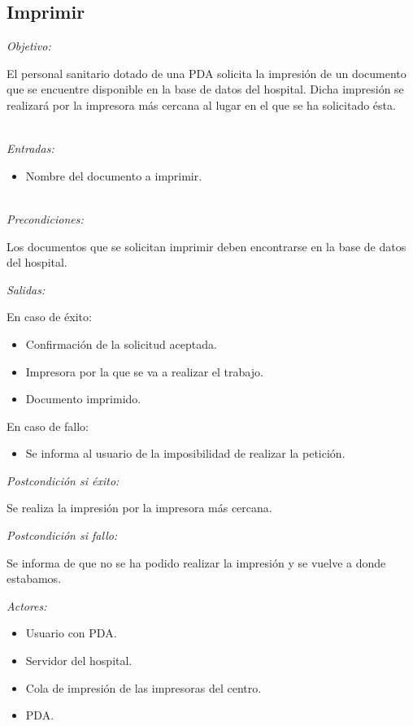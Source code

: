 \documentclass[12pt,a4paper,notitlepage,twoside]{report}
\begin{document}
\subsection{Imprimir}
\emph{Objetivo:}
\begin{description}
El personal sanitario dotado de una PDA solicita la impresi\'on de un documento que se encuentre disponible en la base de datos del hospital. Dicha impresi\'on se realizará por la impresora m\'as cercana al lugar en el que se ha solicitado \'esta.
\end{description}
\\
\emph{Entradas:} 
\begin{itemize}
\item Nombre del documento a imprimir.
\end{itemize}
\\
\emph{Precondiciones:}
\begin{description}
Los documentos que se solicitan imprimir deben encontrarse en la base de datos del hospital.
\end{description}
\emph{Salidas:}
\begin{description}
\item En caso de \'exito: 
\begin{itemize}
\item Confirmaci\'on de la solicitud aceptada.
\item Impresora por la que se va a realizar el trabajo.
\item Documento imprimido.
\end{itemize}
\item En caso de fallo: 
\begin{itemize}
\item Se informa al usuario de la imposibilidad de realizar la petici\'on.
\end{itemize}
\end{description}
\emph{Postcondici\'on si \'exito:}
\begin{description}
Se realiza la impresi\'on por la impresora m\'as cercana.
\end{description}
\emph{Postcondici\'on si fallo:}
\begin{description}
Se informa de que no se ha podido realizar la impresi\'on y se vuelve a donde estabamos.
\end{description}
\emph{Actores: }
\begin{itemize}
\item Usuario con PDA.
\item Servidor del hospital.
\item Cola de impresi\'on de las impresoras del centro.
\item PDA.
\end{itemize}
\end{document}
